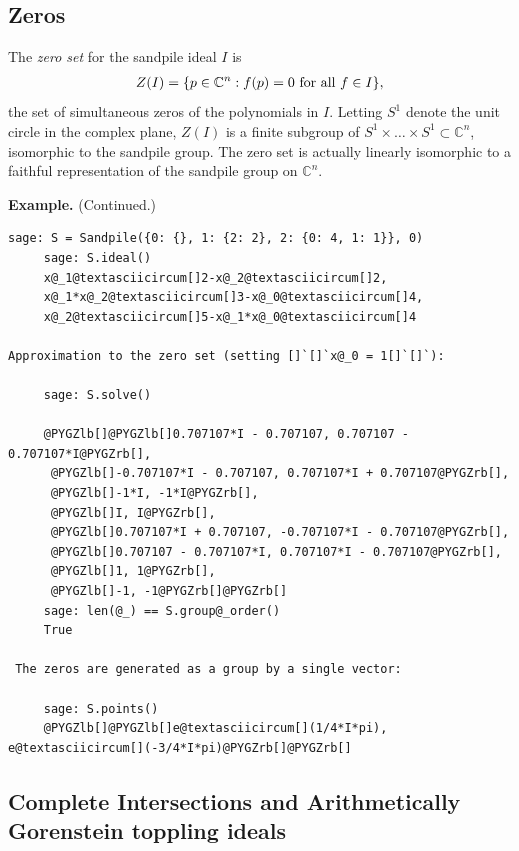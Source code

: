 \documentclass[letterpaper,10pt,english]{manual}
\begin{document}
\subsection{Zeros}

The \emph{zero set} for the sandpile ideal $I$ is
\begin{gather}
\begin{split}Z(I) = \{p\in\mathbb{C}^n: f(p)=0\mbox{ for all $f\in I$}\},\end{split}\notag
\end{gather}
the set of simultaneous zeros of the polynomials in $I.$  Letting $S^1$ denote
the unit circle in the complex plane, $Z(I)$ is a finite
subgroup of $S^1\times\dots\times S^1\subset\mathbb{C}^n$, isomorphic to the
sandpile group.  The zero set is actually linearly isomorphic to a faithful representation of the sandpile group on $\mathbb{C}^n.$

\textbf{Example.} (Continued.)

\begin{Verbatim}[commandchars=@\[\]]
     sage: S = Sandpile({0: {}, 1: {2: 2}, 2: {0: 4, 1: 1}}, 0)
     sage: S.ideal()
     x@_1@textasciicircum[]2-x@_2@textasciicircum[]2,
     x@_1*x@_2@textasciicircum[]3-x@_0@textasciicircum[]4,
     x@_2@textasciicircum[]5-x@_1*x@_0@textasciicircum[]4

Approximation to the zero set (setting []`[]`x@_0 = 1[]`[]`):

     sage: S.solve()

     @PYGZlb[]@PYGZlb[]0.707107*I - 0.707107, 0.707107 - 0.707107*I@PYGZrb[],
      @PYGZlb[]-0.707107*I - 0.707107, 0.707107*I + 0.707107@PYGZrb[],
      @PYGZlb[]-1*I, -1*I@PYGZrb[],
      @PYGZlb[]I, I@PYGZrb[],
      @PYGZlb[]0.707107*I + 0.707107, -0.707107*I - 0.707107@PYGZrb[],
      @PYGZlb[]0.707107 - 0.707107*I, 0.707107*I - 0.707107@PYGZrb[],
      @PYGZlb[]1, 1@PYGZrb[],
      @PYGZlb[]-1, -1@PYGZrb[]@PYGZrb[]
     sage: len(@_) == S.group@_order()
     True

 The zeros are generated as a group by a single vector:

     sage: S.points()
     @PYGZlb[]@PYGZlb[]e@textasciicircum[](1/4*I*pi), e@textasciicircum[](-3/4*I*pi)@PYGZrb[]@PYGZrb[]
\end{Verbatim}
\hypertarget{installation}{}

\subsection{Complete Intersections and Arithmetically Gorenstein toppling ideals}
\end{document}
